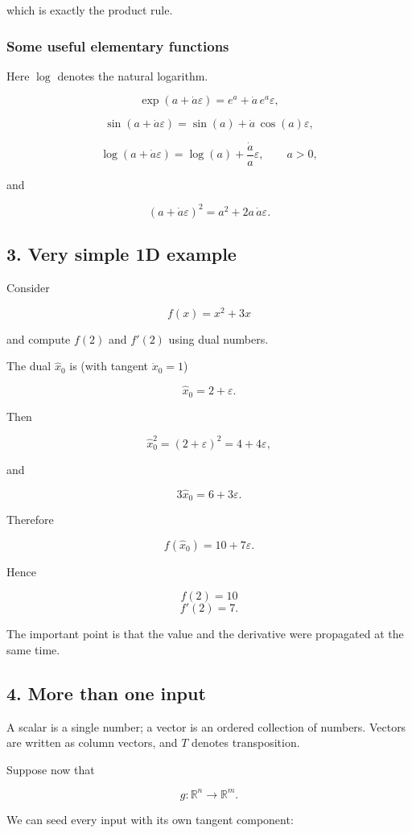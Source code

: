 \documentclass{course_sheet}
\begin{document}
which is exactly the product rule.

\subsubsection*{Some useful elementary functions}
Here $\log$ denotes the natural logarithm.

\[
\exp(a+\dot{a}\varepsilon)
= e^a+\dot{a}\,e^a\varepsilon,
\]

\[
\sin(a+\dot{a}\varepsilon)
= \sin(a)+\dot{a}\,\cos(a)\varepsilon,
\]

\[
\log(a+\dot{a}\varepsilon)
= \log(a)+\frac{\dot{a}}{a}\varepsilon,
\qquad a>0,
\]

and

\[
(a+\dot{a}\varepsilon)^2
= a^2+2a\,\dot{a}\varepsilon.
\]

\subsection*{3. Very simple 1D example}
Consider

\[
f(x)=x^2+3x
\]

and compute $f(2)$ and $f'(2)$ using dual numbers.

The dual $\hat{x}_0$ is (with tangent $\dot{x}_0=1$)

\[
\hat{x}_0=2+\varepsilon.
\]

Then

\[
\hat{x}_0^2=(2+\varepsilon)^2
=4+4\varepsilon,
\]

and

\[
3\hat{x}_0=6+3\varepsilon.
\]

Therefore

\[
f(\hat{x}_0)
=10+7\varepsilon.
\]

Hence

\[
f(2)=10
\]
\[
f'(2)=7.
\]

The important point is that the value and the derivative were propagated at the same time.

\subsection*{4. More than one input}
A scalar is a single number; a vector is an ordered collection of numbers. Vectors are written as column vectors, and $T$ denotes transposition.

Suppose now that

\[
g:\mathbb{R}^n\to\mathbb{R}^m.
\]

We can seed every input with its own tangent component:
\end{document}
